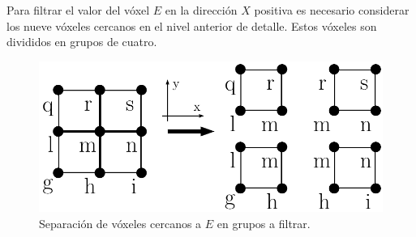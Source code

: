 Para filtrar el valor del vóxel $E$ en la dirección $X$ positiva es necesario considerar los nueve vóxeles cercanos en el nivel anterior de detalle. Estos vóxeles son divididos en grupos de cuatro.

\begin{figure}[H]
    \centering
    \includegraphics[width=.5\linewidth]{media/filtering_2.pdf}
    \caption{Separación de vóxeles cercanos a $E$ en grupos a filtrar.}
\end{figure}

